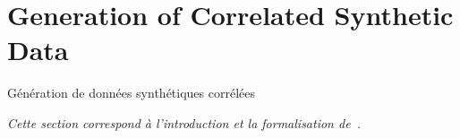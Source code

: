 %
%
%









\newpage



\section{Generation of Correlated Synthetic Data}{Génération de données synthétiques corrélées}

\label{app:sec:syntheticdata}




\textit{Cette section correspond à l'introduction et la formalisation de~\cite{raimbault2016generation}.}

\stars

